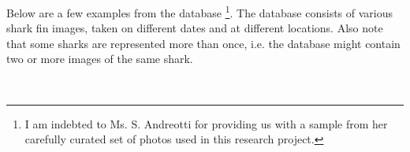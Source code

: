 \documentclass[a4paper,10pt]{article}
\begin{document}
\newpage
Below are a few examples from the database \footnote{I am indebted to
  Ms. S. Andreotti for providing us with a sample from her carefully
    curated set of photos used in this research project.}.  
The database consists of various shark fin images, taken on different dates and
at different locations.
Also note that some sharks are
  represented more than once, i.e. the database
might contain two or more images of the same shark.

\begin{figure}[H]
\centering
\mbox{ \quad
{} \quad
{}}
\end{figure}
\end{document}
